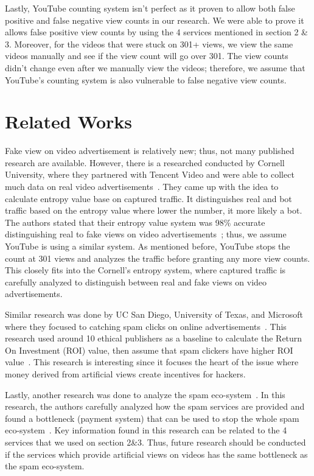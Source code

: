 \documentclass[conference]{IEEEtran}
\begin{document}
Lastly, YouTube counting system isn't perfect as it proven to allow both false positive and false negative view counts in our research. We were able to prove it allows false positive view counts by using the 4 services mentioned in section 2 \& 3. Moreover, for the videos that were stuck on 301+ views, we view the same videos manually and see if the view count will go over 301. The view counts didn't change even after we manually view the videos; therefore, we assume that YouTube’s counting
system is also vulnerable to false negative view counts.

\section{Related Works}

Fake view on video advertisement is relatively new; thus, not many published research are available. However, there is a researched conducted by Cornell University, where they partnered with Tencent Video and were able to collect much data on real video advertisements~\cite{c5}. They came up with the idea to calculate entropy value base on captured traffic. It distinguishes real and bot traffic based on the entropy value where lower the number, it more likely a bot. The authors stated that
their entropy value system was 98\% accurate distinguishing real to fake views on video advertisements~\cite{c5}; thus, we assume YouTube is using a similar system. As mentioned before, YouTube stops the count at 301 views and analyzes the traffic before granting any more view counts. This closely fits into the Cornell’s entropy system, where captured traffic is carefully analyzed to distinguish between real and fake views on video advertisements.

Similar research was done by UC San Diego, University of Texas, and Microsoft where they focused to catching spam clicks on online advertisements~\cite{c18}. This research used around 10 ethical publishers as a baseline to calculate the Return On Investment (ROI) value, then assume that spam clickers have higher ROI value~\cite{c18}. This research is interesting since it focuses the heart of the issue where money derived from artificial views create incentives for hackers.

Lastly, another research was done to analyze the spam eco-system~\cite{c18}. In this research, the authors carefully analyzed how the spam services are provided and found a bottleneck (payment system) that can be used to stop the whole spam eco-system~\cite{c18}. Key information found in this research can be related to the 4 services that we used on section 2\&3. Thus, future research should be conducted if the services which provide artificial views on videos has the same bottleneck as the
spam eco-system.
\end{document}
